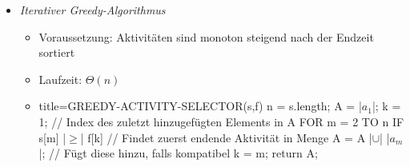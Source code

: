 \documentclass[
    12pt,
    a4paper,
    ngerman,
    color=3b,%
    marginpar=false,
    colorback=false,
    leqno,
]{tudaexercise}
\begin{document}
\begin{itemize}
\begin{itemize}
                \item \textit{Iterativer Greedy-Algorithmus}
                    \begin{itemize}
                        \item Voraussetzung: Aktivitäten sind monoton steigend nach der Endzeit sortiert
                        \item Laufzeit: $\Theta(n)$
                        \item[]
                            \begin{ccode}[autogobble,escapeinside=||]{title={GREEDY-ACTIVITY-SELECTOR(s,f)}}
                            n = s.length;
                            A = {|$a_1$|};
                            k = 1;          // Index des zuletzt hinzugefügten Elements in A
                            FOR m = 2 TO n                      
                                IF s[m] |$\geq$| f[k]           // Findet zuerst endende Aktivität in Menge
                                    A = A |$\cup$| {|$a_m$|};   // Fügt diese hinzu, falls kompatibel
                                    k = m;
                            return A;
                            \end{ccode}
                    \end{itemize}
            \end{itemize}
    \end{itemize}

\clearpage
\end{document}
